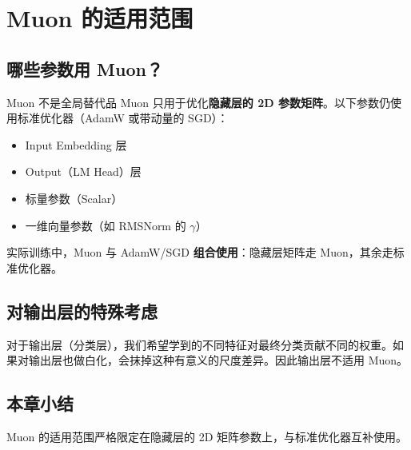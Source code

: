 \section{Muon 的适用范围}

\subsection{哪些参数用 Muon？}

\begin{warningbox}{Muon 不是全局替代品}
Muon 只用于优化\textbf{隐藏层的 2D 参数矩阵}。以下参数仍使用标准优化器（AdamW 或带动量的 SGD）：
\begin{itemize}
  \item Input Embedding 层
  \item Output（LM Head）层
  \item 标量参数（Scalar）
  \item 一维向量参数（如 RMSNorm 的 $\gamma$）
\end{itemize}
\end{warningbox}

实际训练中，Muon 与 AdamW/SGD \textbf{组合使用}：隐藏层矩阵走 Muon，其余走标准优化器。

\subsection{对输出层的特殊考虑}

对于输出层（分类层），我们希望学到的不同特征对最终分类贡献不同的权重。如果对输出层也做白化，会抹掉这种有意义的尺度差异。因此输出层不适用 Muon。

\subsection{本章小结}

Muon 的适用范围严格限定在隐藏层的 2D 矩阵参数上，与标准优化器互补使用。

